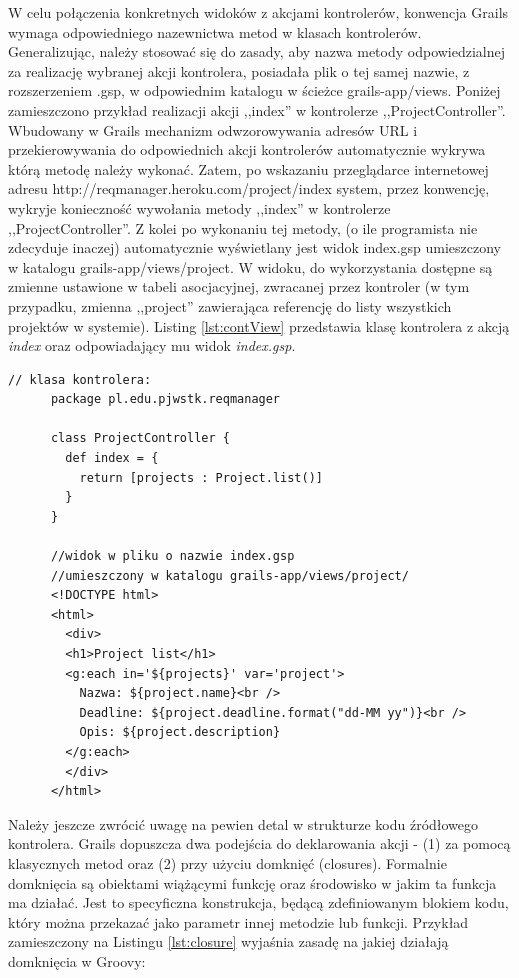     W celu połączenia konkretnych widoków z akcjami kontrolerów, konwencja Grails wymaga odpowiedniego nazewnictwa metod w klasach kontrolerów. Generalizując, należy stosować się do zasady, aby nazwa metody odpowiedzialnej za realizację wybranej akcji kontrolera, posiadała plik o tej samej nazwie, z rozszerzeniem .gsp, w odpowiednim katalogu w ścieżce grails-app/views. Poniżej zamieszczono przykład realizacji akcji ,,index'' w kontrolerze ,,ProjectController''. Wbudowany w Grails mechanizm odwzorowywania adresów URL i przekierowywania do odpowiednich akcji kontrolerów automatycznie wykrywa którą metodę należy wykonać. Zatem, po wskazaniu przeglądarce internetowej adresu http://reqmanager.heroku.com/project/index system, przez konwencję, wykryje konieczność wywołania metody ,,index'' w kontrolerze ,,ProjectController''. Z kolei po wykonaniu tej metody, (o ile programista nie zdecyduje inaczej) automatycznie wyświetlany jest widok index.gsp umieszczony w katalogu grails-app/views/project. W widoku, do wykorzystania dostępne są zmienne ustawione w tabeli asocjacyjnej, zwracanej przez kontroler (w tym przypadku, zmienna ,,project'' zawierająca referencję do listy wszystkich projektów w systemie). Listing \ref{lst:contView} przedstawia klasę kontrolera z akcją \emph{index} oraz odpowiadający mu widok \emph{index.gsp}.


    \begin{lstlisting}[caption={widok i kontroler}, label={lst:contView}]
      // klasa kontrolera:
      package pl.edu.pjwstk.reqmanager

      class ProjectController {
        def index = { 
          return [projects : Project.list()]
        }   
      }

      //widok w pliku o nazwie index.gsp 
      //umieszczony w katalogu grails-app/views/project/
      <!DOCTYPE html>
      <html>
        <div>
        <h1>Project list</h1>
        <g:each in='${projects}' var='project'>
          Nazwa: ${project.name}<br />
          Deadline: ${project.deadline.format("dd-MM yy")}<br />
          Opis: ${project.description} 
        </g:each>
        </div>
      </html>

    \end{lstlisting}

    Należy jeszcze zwrócić uwagę na pewien detal w strukturze kodu źródłowego kontrolera. Grails dopuszcza dwa podejścia do deklarowania akcji - (1) za pomocą klasycznych metod oraz (2) przy użyciu domknięć (closures). Formalnie domknięcia są obiektami wiążącymi funkcję oraz środowisko w jakim ta funkcja ma działać. Jest to specyficzna konstrukcja, będącą zdefiniowanym blokiem kodu, który można przekazać jako parametr innej metodzie lub funkcji. Przykład zamieszczony na Listingu \ref{lst:closure} wyjaśnia zasadę na jakiej działają domknięcia w Groovy: 

